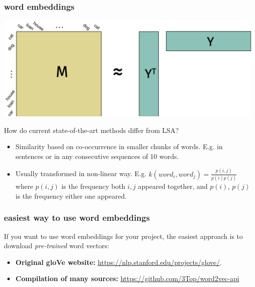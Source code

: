 \documentclass[handout,compress]{beamer}
\begin{document}
\begin{frame}
	\frametitle{word embeddings}
	\small
	\begin{center}
		\includegraphics[width=.7\textwidth]{similarity_fact.png}
	\end{center}
	How do current state-of-the-art methods differ from LSA?
	\begin{itemize}
		\item Similarity based on co-occurrence in smaller chunks of words. E.g. in sentences or in any consecutive sequences of 10 words.
		\item Usually transformed in non-linear way. E.g. $k(word_i,word_j) = \frac{p(i,j)}{p(i)p(j)}$ where $p(i,j)$ is the frequency both $i,j$ appeared together, and $p(i)$, $p(j)$ is the frequency either one appeared. 
	\end{itemize}
	
\end{frame}

\begin{frame}
	\frametitle{easiest way to use word embeddings}
	If you want to use word embeddings for your project, the easiest approach is to download \emph{pre-trained} word vectors:
	\begin{itemize}
		\item \textbf{Original gloVe website:} \url{https://nlp.stanford.edu/projects/glove/}.
		\item \textbf{Compilation of many sources:} \url{https://github.com/3Top/word2vec-api}
	\end{itemize}
\end{frame}
\end{document}
